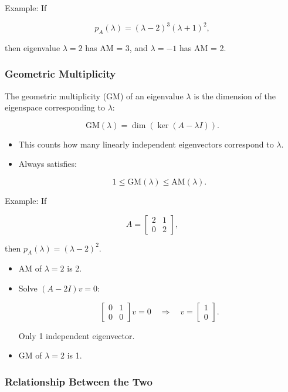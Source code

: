 \documentclass[
  letterpaper,
  DIV=11,
  numbers=noendperiod]{scrreprt}
\begin{document}
Example: If

\[
p_A(\lambda) = (\lambda-2)^3(\lambda+1)^2,
\]

then eigenvalue \(\lambda=2\) has AM = 3, and \(\lambda=-1\) has AM = 2.

\subsubsection{Geometric Multiplicity}\label{geometric-multiplicity}

The geometric multiplicity (GM) of an eigenvalue \(\lambda\) is the
dimension of the eigenspace corresponding to \(\lambda\):

\[
\text{GM}(\lambda) = \dim(\ker(A - \lambda I)).
\]

\begin{itemize}
\item
  This counts how many linearly independent eigenvectors correspond to
  \(\lambda\).
\item
  Always satisfies:

  \[
  1 \leq \text{GM}(\lambda) \leq \text{AM}(\lambda).
  \]
\end{itemize}

Example: If

\[
A = \begin{bmatrix} 2 & 1 \\ 0 & 2 \end{bmatrix},
\]

then \(p_A(\lambda) = (\lambda-2)^2\).

\begin{itemize}
\item
  AM of \(\lambda=2\) is 2.
\item
  Solve \((A-2I)v=0\):

  \[
  \begin{bmatrix} 0 & 1 \\ 0 & 0 \end{bmatrix} v = 0 \quad \Rightarrow \quad v = \begin{bmatrix} 1 \\ 0 \end{bmatrix}.
  \]

  Only 1 independent eigenvector.
\item
  GM of \(\lambda=2\) is 1.
\end{itemize}

\subsubsection{Relationship Between the
Two}\label{relationship-between-the-two}
\end{document}
